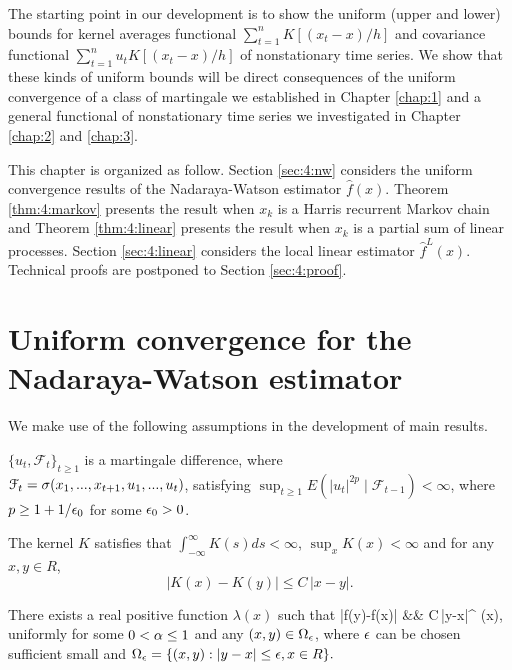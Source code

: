 The starting point in our development is to show the uniform (upper and lower) bounds for kernel averages functional $\sum_{t=1}^{n}K[(x_{t}-x)/h]$ and covariance functional $\sum_{t=1}^{n}u_t K[(x_{t}-x)/h]$ of nonstationary time series. We show that these kinds of uniform bounds will be direct consequences of the uniform convergence of a class of martingale we established in Chapter \ref{chap:1} and a general functional of nonstationary time series we investigated in Chapter \ref{chap:2} and \ref{chap:3}. 

This chapter is organized as follow. Section \ref{sec:4:nw} considers the uniform convergence results of  the Nadaraya-Watson estimator $\widehat{f}(x)$. Theorem \ref{thm:4:markov} presents the result when $x_k$ is a Harris recurrent Markov chain and Theorem \ref{thm:4:linear} presents the result when $x_k$ is a partial sum of linear processes. Section \ref{sec:4:linear} considers the local linear estimator $\widehat{f}^L(x)$. Technical proofs are postponed to Section \ref{sec:4:proof}.

\section{Uniform convergence for the Nadaraya-Watson estimator} 
We make use of the following assumptions in the development of main results.

\begin{assump} 
 $\{u_t, {\mathcal F}_t\}_{t\ge 1}$ is a martingale difference, where\\ ${\mathcal F}_t=\sigma (x_1, ..., x_{t+1}, u_1,...,u_t)$, satisfying $ \sup_{t\ge 1}E(|u_t|^{2p}\mid {\mathcal F}_{t-1})<\infty$, where  $p\ge 1+1/\epsilon_0$ for some $\epsilon_0>0$.
 \end{assump}

\begin{assump} 
The kernel $K$ satisfies that $\int_{-\infty}^{\infty}K(s)ds<\infty$, $\sup_xK(x)<\infty$
 and for any $x, y \in R$, $$ |K(x)-K(y)| \le C\, |x-y|. $$
\end{assump}

\begin{assump} 
There exists a real positive function $\lambda(x)$ such that
\bestar
|f(y)-f(x)| &\leq& C\,|y-x|^{\alpha} \lambda(x),
\eestar
uniformly for some $0<\alpha\le 1$ and  any  $(x, y)\in \Omega_\epsilon$, where $\epsilon$ can be chosen sufficient small and $ \Omega_{\epsilon} = \{(x,y): |y-x|\le \epsilon, x\in R\}. $
\end{assump}


